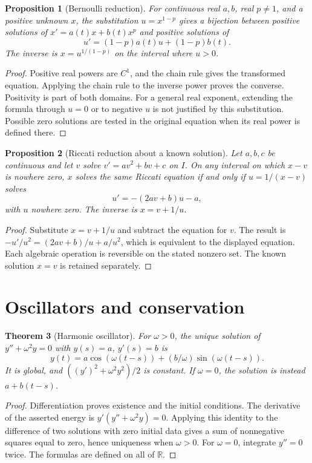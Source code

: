 \documentclass[11pt,oneside]{book}
\newtheorem{theorem}{Theorem}[chapter]
\newtheorem{proposition}[theorem]{Proposition}
\theoremstyle{definition}
\theoremstyle{remark}\newtheorem{remark}[theorem]{Remark}
\newcommand{\R}{\mathbb R}\newcommand{\C}{\mathbb C}
\begin{document}
\begin{proposition}[Bernoulli reduction]\label{d13:02:bernoulli}
For continuous real $a,b$, real $p\ne1$, and a positive unknown $x$,
the substitution $u=x^{1-p}$ gives a bijection between positive solutions
of $x'=a(t)x+b(t)x^p$ and positive solutions of
\[
 u'=(1-p)a(t)u+(1-p)b(t).
\]
The inverse is $x=u^{1/(1-p)}$ on the interval where $u>0$.
\end{proposition}
\begin{proof}
Positive real powers are $C^1$, and the chain rule gives the transformed
equation. Applying the chain rule to the inverse power proves the converse.
Positivity is part of both domains. For a general real exponent, extending
the formula through $u=0$ or to negative $u$ is not justified by this
substitution. Possible zero solutions are tested in the original equation
when its real power is defined there.
\end{proof}

\begin{proposition}[Riccati reduction about a known solution]\label{d13:02:riccati}
Let $a,b,c$ be continuous and let $v$ solve $v'=av^2+bv+c$ on $I$.
On any interval on which $x-v$ is nowhere zero, $x$ solves the same
Riccati equation if and only if $u=1/(x-v)$ solves
\[
 u'=-(2av+b)u-a,
\]
with $u$ nowhere zero. The inverse is $x=v+1/u$.
\end{proposition}
\begin{proof}
Substitute $x=v+1/u$ and subtract the equation for $v$. The result is
$-u'/u^2=(2av+b)/u+a/u^2$, which is equivalent to the displayed equation.
Each algebraic operation is reversible on the stated nonzero set. The
known solution $x=v$ is retained separately.
\end{proof}

\section{Oscillators and conservation}
\begin{theorem}[Harmonic oscillator]\label{d13:02:oscillator}
For $\omega>0$, the unique solution of $y''+\omega^2y=0$ with
$y(s)=a$, $y'(s)=b$ is
\[
 y(t)=a\cos(\omega(t-s))+(b/\omega)\sin(\omega(t-s)).
\]
It is global, and $((y')^2+\omega^2y^2)/2$ is constant. If $\omega=0$,
the solution is instead $a+b(t-s)$.
\end{theorem}
\begin{proof}
Differentiation proves existence and the initial conditions. The derivative
of the asserted energy is $y'(y''+\omega^2y)=0$. Applying this identity
to the difference of two solutions with zero initial data gives a sum of
nonnegative squares equal to zero, hence uniqueness when $\omega>0$.
For $\omega=0$, integrate $y''=0$ twice. The formulas are defined on all
of $\R$.
\end{proof}
\end{document}
